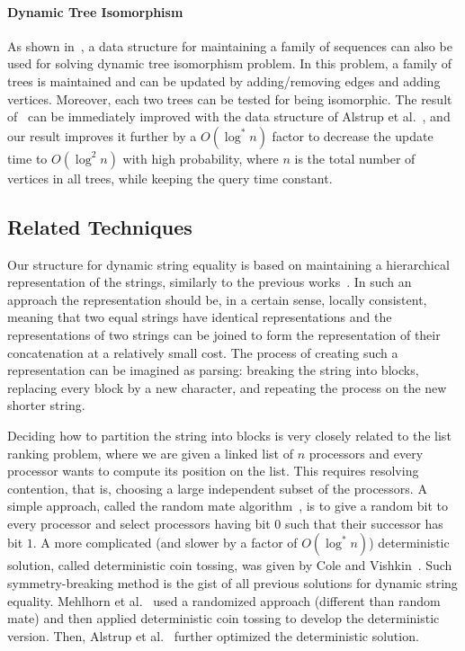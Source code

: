 \documentclass[a4paper]{article}
\theoremstyle{remark}
\begin{document}
\paragraph{Dynamic Tree Isomorphism}
As shown in~\cite{treei}, a data structure for maintaining a family of sequences can also be used for solving dynamic tree isomorphism problem.
In this problem, a family of trees is maintained and can be updated by adding/removing edges and adding vertices.
Moreover, each two trees can be tested for being isomorphic.
The result of~\cite{treei} can be immediately improved with the data structure of
Alstrup et al.~\cite{Alstrup}, and our result improves it further by a $O(\log^{*} n)$ factor
to decrease the update time to $O(\log^2 n)$ with high probability, where $n$ is the total number of vertices in all trees, while keeping the query time constant.

\subsection{Related Techniques}
Our structure for dynamic string equality is based on maintaining a hierarchical representation
of the strings, similarly to the previous works~\cite{Mehlhorn,Alstrup}.
In such an approach the representation should be, in a certain sense, locally consistent, meaning that
two equal strings have identical representations and the representations of two strings
can be joined to form the representation of their concatenation at a relatively small cost.
The process of creating such a representation can be imagined as parsing: breaking the string into blocks,
replacing every block by a new character, and repeating the process on the new shorter
string.

Deciding how to partition the string into blocks is very closely related to the
list ranking problem, where we are given a linked list of $n$ processors and every processor wants
to compute its position on the list. This requires resolving contention, that
is, choosing a large independent subset of the processors. A simple approach,
called the random mate algorithm~\cite{TreeContraction,Vishkin}, is to give a random bit
to every processor and select processors having bit $0$ such that their successor has bit $1$.
A more complicated (and slower by a factor of $O(\log^*n)$) deterministic solution, called deterministic
coin tossing, was given by Cole and Vishkin~\cite{DeterministicTossing}. Such symmetry-breaking
method is the gist of all previous solutions for dynamic string equality. Mehlhorn et al.~\cite{Mehlhorn}
used a randomized approach (different than random mate) and then applied deterministic coin tossing
to develop the deterministic version. Then, Alstrup et al.~\cite{Alstrup} further optimized the
deterministic solution.
\end{document}
